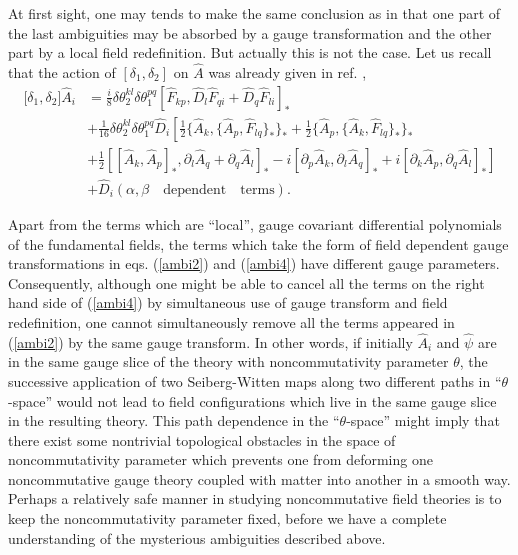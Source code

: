 \documentclass[a4paper,a4paper]{article}%
\begin{document}
At first sight, one may tends to make the same conclusion as in \cite{13} that
one part of the last ambiguities may be absorbed by a gauge transformation and
the other part by a local field redefinition. But actually this is not the
case. Let us recall that the action of $[\delta_{1},\delta_{2}]$ on $\hat{A}$
was already given in ref. \cite{13},%
\begin{align}
\lbrack\delta_{1},\delta_{2}]\hat{A}_{i}  &  =\frac{i}{8}\delta\theta_{2}%
^{kl}\delta\theta_{1}^{pq}[\hat{F}_{kp},\hat{D}_{l}\hat{F}_{qi}+\hat{D}%
_{q}\hat{F}_{li}]_{\ast}\nonumber\\
&  +\frac{1}{16}\delta\theta_{2}^{kl}\delta\theta_{1}^{pq}\hat{D}_{i}\left[
\frac{1}{2}\{\hat{A}_{k},\{\hat{A}_{p},\hat{F}_{lq}\}_{\ast}\}_{\ast}+\frac
{1}{2}\{\hat{A}_{p},\{\hat{A}_{k},\hat{F}_{lq}\}_{\ast}\}_{\ast}\right.
\nonumber\\
&  +\left.  \frac{1}{2}[[\hat{A}_{k},\hat{A}_{p}]_{\ast},\partial
_{l}\hat{A}_{q}+\partial_{q}\hat{A}_{l}]_{\ast}-i[\partial_{p}\hat{A}_{k}%
,\partial_{l}\hat{A}_{q}]_{\ast}+i[\partial_{k}\hat{A}_{p},\partial
_{q}\hat{A}_{l}]_{\ast}\right] \nonumber\\
&  +\hat{D}_{i}(\alpha,\beta\quad\mathrm{dependent\quad terms}). \label{ambi4}%
\end{align}

Apart from the terms which are ``local'', gauge covariant differential
polynomials of the fundamental fields, the terms which take the form of field
dependent gauge transformations in eqs. (\ref{ambi2}) and (\ref{ambi4}) have
different gauge parameters. Consequently, although one might be able to cancel
all the terms on the right hand side of (\ref{ambi4}) by simultaneous use of
gauge transform and field redefinition, one cannot simultaneously remove all
the terms appeared in (\ref{ambi2}) by the same gauge transform. In other
words, if initially $\hat{A}_{i}$ and $\hat{\psi}$ are in the same gauge slice
of the theory with noncommutativity parameter $\theta$, the successive
application of two Seiberg-Witten maps along two different paths in ``$\theta
$-space'' would not lead to field configurations which live in the same gauge
slice in the resulting theory. This path dependence in the ``$\theta$-space''
might imply that there exist some nontrivial topological obstacles in the
space of noncommutativity parameter which prevents one from deforming one
noncommutative gauge theory coupled with matter into another in a smooth way.
Perhaps a relatively safe manner in studying noncommutative field theories is
to keep the noncommutativity parameter fixed, before we have a complete
understanding of the mysterious ambiguities described above.
\end{document}
